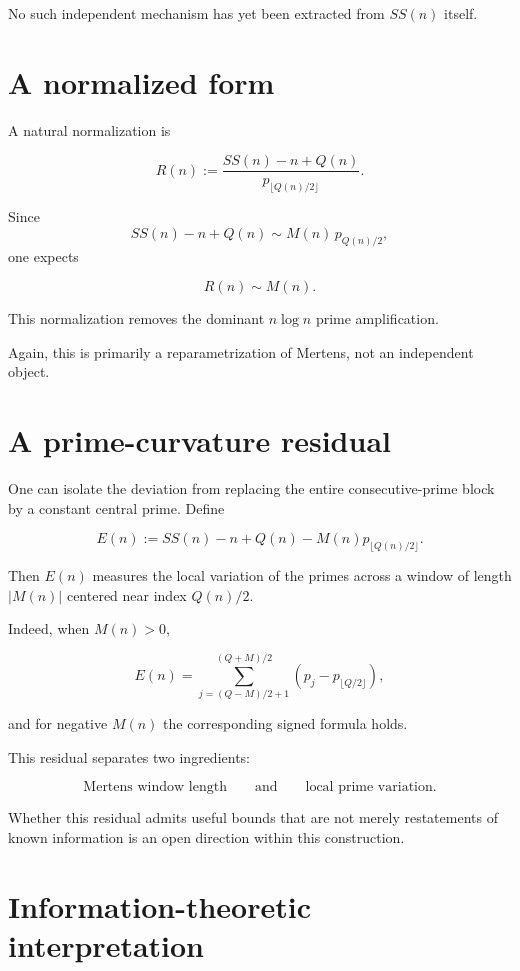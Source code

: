 \documentclass[11pt]{amsart}
\newcommand{\Mert}{M}
\newcommand{\Sq}{Q}
\begin{document}
No such independent mechanism has yet been extracted from $SS(n)$ itself.

\section{A normalized form}

A natural normalization is

\[
\boxed{
R(n)
:=
\frac{SS(n)-n+\Sq(n)}
{p_{\lfloor \Sq(n)/2\rfloor}}.
}
\]

Since
\[
SS(n)-n+\Sq(n)
\sim
\Mert(n)\,p_{\Sq(n)/2},
\]
one expects

\[
\boxed{
R(n)\sim \Mert(n).
}
\]

This normalization removes the dominant $n\log n$ prime amplification.

Again, this is primarily a reparametrization of Mertens, not an independent object.

\section{A prime-curvature residual}

One can isolate the deviation from replacing the entire consecutive-prime block by a constant central prime. Define

\[
\boxed{
E(n)
:=
SS(n)-n+\Sq(n)
-
\Mert(n)p_{\lfloor \Sq(n)/2\rfloor}.
}
\]

Then $E(n)$ measures the local variation of the primes across a window of length $|\Mert(n)|$ centered near index $\Sq(n)/2$.

Indeed, when $\Mert(n)>0$,

\[
E(n)
=
\sum_{j=(\Sq-\Mert)/2+1}^{(\Sq+\Mert)/2}
\left(
p_j-p_{\lfloor \Sq/2\rfloor}
\right),
\]

and for negative $\Mert(n)$ the corresponding signed formula holds.

This residual separates two ingredients:

\[
\boxed{\text{Mertens window length}}
\qquad\text{and}\qquad
\boxed{\text{local prime variation}}.
\]

Whether this residual admits useful bounds that are not merely restatements of known information is an open direction within this construction.

\section{Information-theoretic interpretation}
\end{document}
